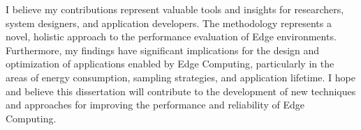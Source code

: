 I believe my contributions represent valuable tools and insights for researchers, system designers, and application developers.
The methodology represents a novel, holistic approach to the performance evaluation of Edge environments.
Furthermore, my findings have significant implications for the design and optimization of applications enabled by Edge Computing, particularly in the areas of energy consumption, sampling strategies, and application lifetime.
I hope and believe this dissertation will contribute to the development of new techniques and approaches for improving the performance and reliability of Edge Computing.